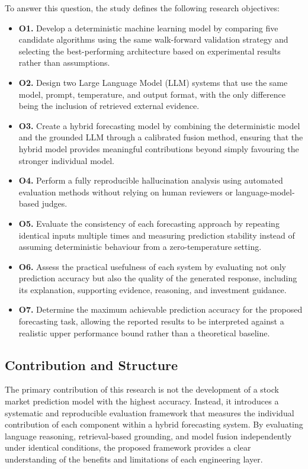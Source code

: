 To answer this question, the study defines the following research
objectives:

\begin{itemize}
\item
  \textbf{O1.} Develop a deterministic machine learning model by
  comparing five candidate algorithms using the same walk-forward
  validation strategy and selecting the best-performing architecture
  based on experimental results rather than assumptions.
\item
  \textbf{O2.} Design two Large Language Model (LLM) systems that use
  the same model, prompt, temperature, and output format, with the only
  difference being the inclusion of retrieved external evidence.
\item
  \textbf{O3.} Create a hybrid forecasting model by combining the
  deterministic model and the grounded LLM through a calibrated fusion
  method, ensuring that the hybrid model provides meaningful
  contributions beyond simply favouring the stronger individual model.
\item
  \textbf{O4.} Perform a fully reproducible hallucination analysis using
  automated evaluation methods without relying on human reviewers or
  language-model-based judges.
\item
  \textbf{O5.} Evaluate the consistency of each forecasting approach by
  repeating identical inputs multiple times and measuring prediction
  stability instead of assuming deterministic behaviour from a
  zero-temperature setting.
\item
  \textbf{O6.} Assess the practical usefulness of each system by
  evaluating not only prediction accuracy but also the quality of the
  generated response, including its explanation, supporting evidence,
  reasoning, and investment guidance.
\item
  \textbf{O7.} Determine the maximum achievable prediction accuracy for
  the proposed forecasting task, allowing the reported results to be
  interpreted against a realistic upper performance bound rather than a
  theoretical baseline.
\end{itemize}

\subsection{Contribution and Structure}\label{sec:contribution}

The primary contribution of this research is not the development of a
stock market prediction model with the highest accuracy. Instead, it
introduces a systematic and reproducible evaluation framework that
measures the individual contribution of each component within a hybrid
forecasting system. By evaluating language reasoning, retrieval-based
grounding, and model fusion independently under identical conditions,
the proposed framework provides a clear understanding of the benefits
and limitations of each engineering layer.

